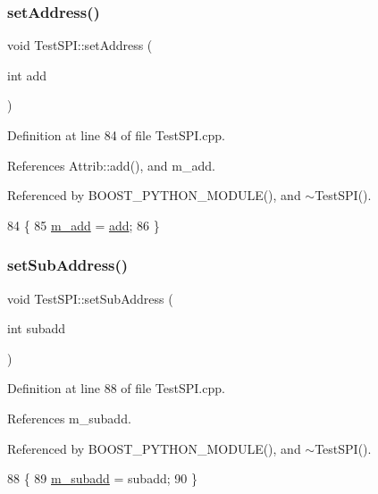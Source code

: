 \subsubsection{\texorpdfstring{set\+Address()}{setAddress()}}
{\footnotesize\ttfamily void Test\+S\+P\+I\+::set\+Address (\begin{DoxyParamCaption}\item[{int}]{add }\end{DoxyParamCaption})}



Definition at line 84 of file Test\+S\+P\+I.\+cpp.



References Attrib\+::add(), and m\+\_\+add.



Referenced by B\+O\+O\+S\+T\+\_\+\+P\+Y\+T\+H\+O\+N\+\_\+\+M\+O\+D\+U\+L\+E(), and $\sim$\+Test\+S\+P\+I().


\begin{DoxyCode}
84                                \{
85   \hyperlink{classTestSPI_aa30affe50de58083b1dcca878903b0a7}{m\_add} = \hyperlink{classAttrib_a235f773af19c900264a190b00a3b4ad7}{add};
86 \}
\end{DoxyCode}
\mbox{\label{classTestSPI_aef2329f6379983f05038752a1ca3f190}} 
\subsubsection{\texorpdfstring{set\+Sub\+Address()}{setSubAddress()}}
{\footnotesize\ttfamily void Test\+S\+P\+I\+::set\+Sub\+Address (\begin{DoxyParamCaption}\item[{int}]{subadd }\end{DoxyParamCaption})}



Definition at line 88 of file Test\+S\+P\+I.\+cpp.



References m\+\_\+subadd.



Referenced by B\+O\+O\+S\+T\+\_\+\+P\+Y\+T\+H\+O\+N\+\_\+\+M\+O\+D\+U\+L\+E(), and $\sim$\+Test\+S\+P\+I().


\begin{DoxyCode}
88                                      \{
89   \hyperlink{classTestSPI_a4bc59347208b4a5ae97188bdcfc31da2}{m\_subadd} = subadd;
90 \}
\end{DoxyCode}


